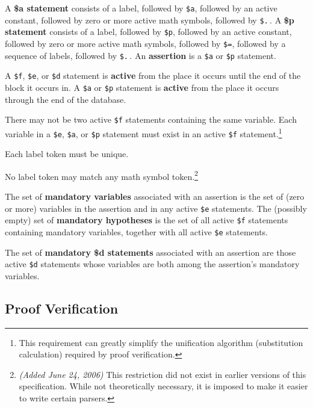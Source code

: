 A {\bf \$a statement} consists of a label,
followed by \texttt{\$a}, followed by an active constant, followed by
zero or more active math symbols, followed by \texttt{\$.}\,.  A {\bf
\$p statement} consists of a label,
followed by \texttt{\$p}, followed by an active constant, followed by
zero or more active math symbols, followed by \texttt{\$=}, followed by
a sequence of labels, followed by \texttt{\$.}\,.  An {\bf
assertion} is a \texttt{\$a} or \texttt{\$p} statement.

A \texttt{\$f}, \texttt{\$e}, or \texttt{\$d} statement is {\bf active} from the place it occurs until the end of the block it occurs in.
A \texttt{\$a} or \texttt{\$p} statement is {\bf active} from the place it occurs
through the end of the database.

There may not be two active \texttt{\$f} statements containing the same
variable.  Each variable in a \texttt{\$e}, \texttt{\$a}, or
\texttt{\$p} statement must exist in an active \texttt{\$f}
statement.\footnote{This requirement can greatly simplify the
unification algorithm (substitution calculation) required by proof
verification.}

Each label token must be unique.

No label token may match any math symbol
token.\label{namespace}\footnote{{\em (Added June 24, 2006)} This
restriction did not exist in earlier versions of this specification.
While not theoretically necessary, it is imposed to make it easier to
write certain parsers.}

The set of {\bf mandatory variables} associated with
an assertion is the set of (zero or more) variables in the assertion and in any
active \texttt{\$e} statements.  The (possibly empty) set of {\bf mandatory
hypotheses} is the set of all active \texttt{\$f}
statements containing mandatory variables, together with all active \texttt{\$e}
statements.

The set of {\bf mandatory {\bf \$d} statements} associated with an assertion are those active
\texttt{\$d} statements whose variables are both among the assertion's
mandatory variables.

\subsection{Proof Verification}\label{spec4}

